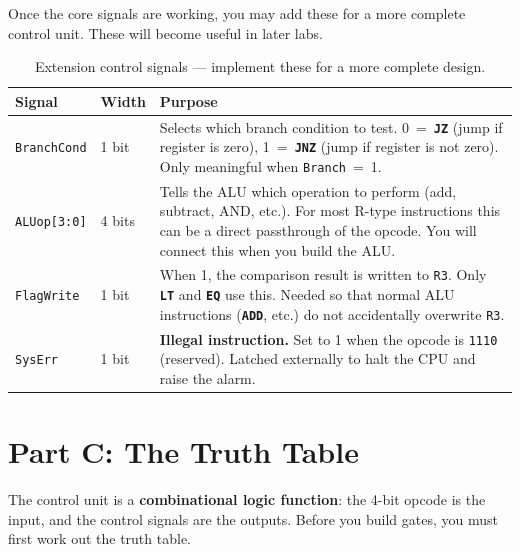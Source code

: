 \documentclass[11pt,a4paper]{article}
\newcommand{\reg}[1]{\texttt{R#1}}
\newcommand{\opcode}[1]{\texttt{#1}}
\newcommand{\instr}[1]{\texttt{\textbf{#1}}}
\newcommand{\flag}[1]{\texttt{#1}}
\begin{document}
Once the core signals are working, you may add these for a more complete control unit.
These will become useful in later labs.

\renewcommand{\arraystretch}{1.4}
\begin{table}[H]
\centering
\begin{tabularx}{\textwidth}{l l X}
\toprule
\textbf{Signal} & \textbf{Width} & \textbf{Purpose} \\
\midrule
\flag{BranchCond} & 1 bit &
  Selects which branch condition to test.
  0~=~\instr{JZ} (jump if register is zero),
  1~=~\instr{JNZ} (jump if register is not zero).
  Only meaningful when \flag{Branch}~=~1. \\

\flag{ALUop[3:0]} & 4 bits &
  Tells the ALU which operation to perform (add, subtract, AND, etc.).
  For most R-type instructions this can be a direct passthrough of the opcode.
  You will connect this when you build the ALU. \\

\flag{FlagWrite} & 1 bit &
  When 1, the comparison result is written to \reg{3}.
  Only \instr{LT} and \instr{EQ} use this.
  Needed so that normal ALU instructions (\instr{ADD}, etc.) do not accidentally overwrite \reg{3}. \\

\flag{SysErr} & 1 bit &
  \textbf{Illegal instruction.}
  Set to 1 when the opcode is \opcode{1110} (reserved).
  Latched externally to halt the CPU and raise the alarm. \\

\bottomrule
\end{tabularx}
\caption{Extension control signals --- implement these for a more complete design.}
\end{table}


\section{Part C: The Truth Table}

The control unit is a \textbf{combinational logic function}: the 4-bit opcode is the input, and the control signals are the outputs. Before you build gates, you must first work out the truth table.
\end{document}
